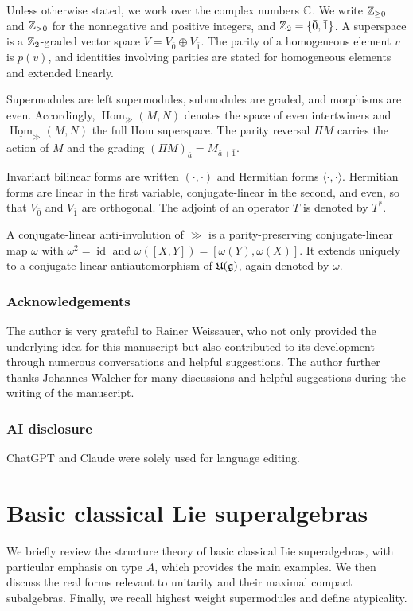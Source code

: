 Unless otherwise stated, we work over the complex numbers ${\mathbb C}$. We write ${\mathbb Z}_{\geq0}$ and ${\mathbb Z}_{>0}$ for the nonnegative and positive integers, and ${\mathbb Z}_2=\{\bar0,\bar1\}$. A superspace is a ${\mathbb Z}_2$-graded vector space $V=V_{\bar0}\oplus V_{\bar1}$. The parity of a homogeneous element $v$ is $p(v)$, and identities involving parities are stated for homogeneous elements and extended linearly.

Supermodules are left supermodules, submodules are graded, and morphisms are even. Accordingly, $\operatorname{Hom}_{\gg}(M,N)$ denotes the space of even intertwiners and $\underline{\operatorname{Hom}}_{\gg}(M,N)$ the full Hom superspace. The parity reversal $\Pi M$ carries the action of $M$ and the grading $(\Pi M)_{\bar a}=M_{\bar a+\bar1}$.

Invariant bilinear forms are written $(\cdot,\cdot)$ and Hermitian forms $\langle\cdot,\cdot\rangle$. Hermitian forms are linear in the first variable, conjugate-linear in the second, and even, so that $V_{\bar0}$ and $V_{\bar1}$ are orthogonal. The adjoint of an operator $T$ is denoted by $T^\ast$.

A conjugate-linear anti-involution of $\gg$ is a parity-preserving conjugate-linear map $\omega$ with $\omega^2=\operatorname{id}$ and $\omega([X,Y])=[\omega(Y),\omega(X)]$. It extends uniquely to a conjugate-linear antiautomorphism of ${\mathfrak U}({\mathfrak{g}})$, again denoted by $\omega$.


\subsubsection*{Acknowledgements}
The author is very grateful to Rainer Weissauer, who not only provided the underlying idea for this manuscript but also contributed to its development through numerous conversations and helpful suggestions. The author further thanks Johannes Walcher for many discussions and helpful suggestions during the writing of the manuscript.



\subsubsection*{AI disclosure}
ChatGPT and Claude were solely used for language editing. 

\section{Basic classical Lie superalgebras}\label{sec::basic_classical_Lie_superalgebras}
\noindent
We briefly review the structure theory of basic classical Lie superalgebras, with particular emphasis on type $A$, which provides the main examples. We then discuss the real forms relevant to unitarity and their maximal compact subalgebras. Finally, we recall highest weight supermodules and define atypicality.

